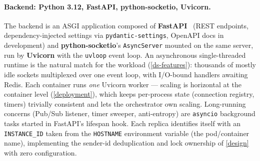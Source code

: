 \documentclass{scrartcl}
\begin{document}
\paragraph{Backend: Python 3.12, FastAPI, python-socketio, Uvicorn.}
The backend is an ASGI application composed of \textbf{FastAPI}~\cite{fastapi}
(REST endpoints, dependency-injected settings via \texttt{pydantic-settings},
OpenAPI docs in development) and \textbf{python-socketio}'s \texttt{AsyncServer}
mounted on the same server, run by \textbf{Uvicorn} with the \texttt{uvloop}
event loop. An asynchronous single-threaded runtime is the natural match for the
workload (\cref{ds-features}): thousands of mostly idle sockets multiplexed over
one event loop, with I/O-bound handlers awaiting Redis. Each container runs
\emph{one} Uvicorn worker --- scaling is horizontal at the container level
(\cref{deployment}), which keeps per-process state (connection registry, timers)
trivially consistent and lets the orchestrator own scaling. Long-running concerns
(Pub/Sub listener, timer sweeper, anti-entropy) are \texttt{asyncio} background
tasks started in FastAPI's lifespan hook. Each replica identifies itself with an
\texttt{INSTANCE\_ID} taken from the \texttt{HOSTNAME} environment variable (the
pod/container name), implementing the sender-id deduplication and lock ownership
of \cref{design} with zero configuration.
\end{document}

